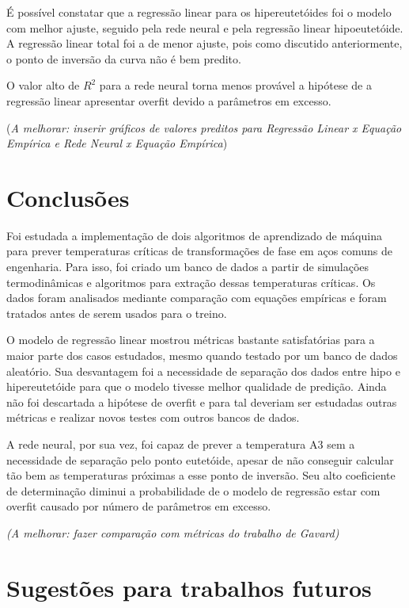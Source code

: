 \documentclass[brazil,tf,epusp]{usp}  %
\begin{document}
É possível constatar que a regressão linear para os hipereutetóides foi o modelo com melhor ajuste, seguido pela rede neural e pela regressão linear hipoeutetóide. A regressão linear total foi a de menor ajuste, pois como discutido anteriormente, o ponto de inversão da curva não é bem predito.

O valor alto de $R^{2}$ para a rede neural torna menos provável a hipótese de a regressão linear apresentar overfit devido a parâmetros em excesso.

(\textit{A melhorar: inserir gráficos de valores preditos para Regressão Linear x Equação Empírica e Rede Neural x Equação Empírica})

\chapter{Conclusões}

Foi estudada a implementação de dois algoritmos de aprendizado de máquina para prever temperaturas críticas de transformações de fase em aços comuns de engenharia. Para isso, foi criado um banco de dados a partir de simulações termodinâmicas e algoritmos para extração dessas temperaturas críticas. Os dados foram analisados mediante comparação com equações empíricas e foram tratados antes de serem usados para o treino.

O modelo de regressão linear mostrou métricas bastante satisfatórias para a maior parte dos casos estudados, mesmo quando testado por um banco de dados aleatório. Sua desvantagem foi a necessidade de separação dos dados entre hipo e hipereutetóide para que o modelo tivesse melhor qualidade de predição. Ainda não foi descartada a hipótese de overfit e para tal deveriam ser estudadas outras métricas e realizar novos testes com outros bancos de dados.

A rede neural, por sua vez, foi capaz de prever a temperatura A3 sem a necessidade de separação pelo ponto eutetóide, apesar de não conseguir calcular tão bem as temperaturas próximas a esse ponto de inversão. Seu alto coeficiente de determinação diminui a probabilidade de o modelo de regressão estar com overfit causado por número de parâmetros em excesso.

\textit{(A melhorar: fazer comparação com métricas do trabalho de Gavard)}

\chapter{Sugestões para trabalhos futuros}
\end{document}
